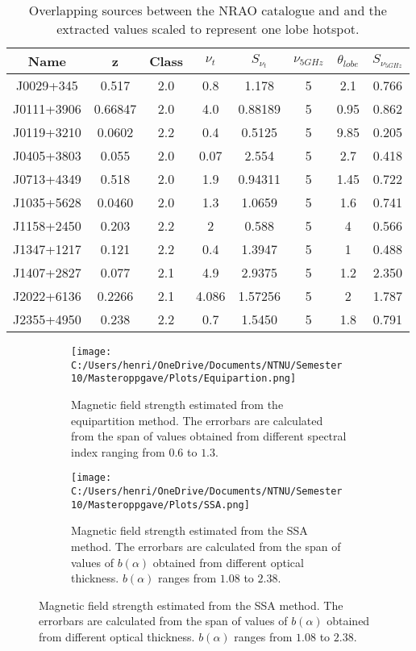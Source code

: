 \begin{table}
    \centering
    \begin{tabular}{|c|c|c|c|c|c|c|c|}
    \hline
    \textbf{Name} & \textbf{z} & \textbf{Class} & \textbf{$\nu_t$} & \textbf{$S_{\nu_t}$} & \textbf{$\nu_{5GHz}$} & \textbf{$\theta_{lobe}$} & \textbf{$S_{\nu_{5GHz}}$} \\
    \hline
    J0029+345 & 0.517 & 2.0 & 0.8 & 1.178 & 5 & 2.1 & 0.766 \\
    J0111+3906 & 0.66847 & 2.0 & 4.0 & 0.88189 & 5 & 0.95 & 0.862 \\
    J0119+3210 & 0.0602 & 2.2 & 0.4 & 0.5125 & 5 & 9.85 & 0.205 \\
    J0405+3803 & 0.055 & 2.0 & 0.07 & 2.554 & 5 & 2.7 & 0.418 \\
    J0713+4349 & 0.518 & 2.0 & 1.9 & 0.94311 & 5 & 1.45 & 0.722 \\
    J1035+5628 & 0.0460 & 2.0 & 1.3 & 1.0659 & 5 & 1.6 & 0.741 \\
    J1158+2450 & 0.203 & 2.2 & 2 & 0.588 & 5 & 4 & 0.566 \\
    J1347+1217 & 0.121 & 2.2 & 0.4 & 1.3947 & 5 & 1 & 0.488 \\
    J1407+2827 & 0.077 & 2.1 & 4.9 & 2.9375 & 5 & 1.2 & 2.350 \\
    J2022+6136 & 0.2266 & 2.1 & 4.086 & 1.57256 & 5 & 2 & 1.787 \\
    J2355+4950 & 0.238 & 2.2 & 0.7 & 1.5450 & 5 & 1.8 & 0.791 \\
    \hline
    \end{tabular}
    \caption{Overlapping sources between the NRAO catalogue and \cite{kiehlmann2023compact} and the extracted values scaled to represent one lobe hotspot.}
    \label{tab:CSO_B}
\end{table}


\begin{figure}[H]
    
    \centering
    \begin{subfigure}[b]{0.49\textwidth}
        \centering
        \texttt{[image: C:/Users/henri/OneDrive/Documents/NTNU/Semester 10/Masteroppgave/Plots/Equipartion.png]}
        \caption{Magnetic field strength estimated from the equipartition method. The errorbars are calculated from the span of values obtained from different spectral index ranging from $0.6$ to $1.3$.}
       
        \label{fig:B_field}
    \end{subfigure}
    \hfill
    \begin{subfigure}[b]{0.49\textwidth}
        \centering
        \texttt{[image: C:/Users/henri/OneDrive/Documents/NTNU/Semester 10/Masteroppgave/Plots/SSA.png]}
        \caption{Magnetic field strength estimated from the SSA method. The errorbars are calculated from the span of values of $b(\alpha)$ obtained from different optical thickness. $b(\alpha)$ ranges from $1.08$ to $2.38$.}
        \label{fig:B_field_SSA}
    \end{subfigure}
\end{figure}





